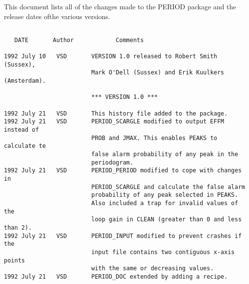  

{\noindent This document lists all of the changes made to the PERIOD
package and the release dates of\newline the various versions.}
\vspace{10mm}



\begin{verbatim}

   DATE       Author            Comments
                           
1992 July 10   VSD       VERSION 1.0 released to Robert Smith (Sussex), 
                         Mark O'Dell (Sussex) and Erik Kuulkers (Amsterdam).
                           
                         *** VERSION 1.0 *** 
                           
1992 July 21   VSD       This history file added to the package.
1992 July 21   VSD       PERIOD_SCARGLE modified to output EFFM instead of
                         PROB and JMAX. This enables PEAKS to calculate te
                         false alarm probability of any peak in the
                         periodogram.
1992 July 21   VSD       PERIOD_PERIOD modified to cope with changes in
                         PERIOD_SCARGLE and calculate the false alarm
                         probability of any peak selected in PEAKS.
                         Also included a trap for invalid values of the 
                         loop gain in CLEAN (greater than 0 and less than 2).
1992 July 21   VSD       PERIOD_INPUT modified to prevent crashes if the 
                         input file contains two contiguous x-axis points 
                         with the same or decreasing values.
1992 July 21   VSD       PERIOD_DOC extended by adding a recipe.
                           
\end{verbatim}



